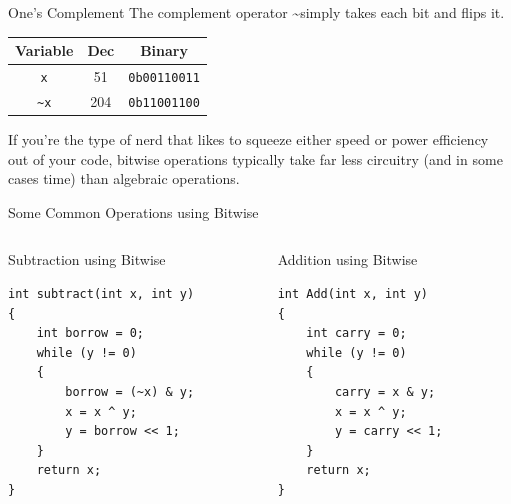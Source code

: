 \documentclass[11pt]{beamer}
\begin{document}
\begin{frame}{One's Complement}
The complement operator \textasciitilde simply takes each bit and flips it.  
\center
\begin{tabular}{| c | c | c |}
\hline
Variable & Dec & Binary \\ \hline
\texttt{x} & 51 & \texttt{0b00110011} \\ \hline
\texttt{\textasciitilde x} & 204 & \texttt{0b11001100} \\ \hline
\end{tabular}
\flushleft
If you're the type of nerd that likes to squeeze either speed or power efficiency out of your code, bitwise operations typically take far less circuitry (and in some cases time) than algebraic operations.  
\end{frame}

\begin{frame}[fragile=singleslide]{Some Common Operations using Bitwise}
\begin{columns}
\begin{column}{0.5\textwidth}
Subtraction using Bitwise
\begin{lstlisting}[style=C]
int subtract(int x, int y) 
{ 
	int borrow = 0;
    while (y != 0) 
    { 
        borrow = (~x) & y; 
        x = x ^ y; 
        y = borrow << 1; 
    } 
    return x; 
} 
\end{lstlisting}
\end{column}
\begin{column}{0.5\textwidth}
Addition using Bitwise
\begin{lstlisting}[style=C]
int Add(int x, int y)  
{  
	int carry = 0;
    while (y != 0)  
    {  
        carry = x & y;  
        x = x ^ y;  
        y = carry << 1;  
    }  
    return x;  
}  
\end{lstlisting}
\end{column}
\end{columns}
\end{frame}

\end{document}

